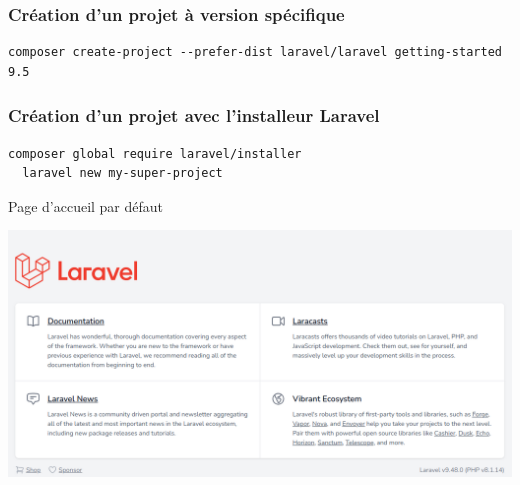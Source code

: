 \documentclass{beamer}
\begin{document}
\begin{frame}[fragile]
\frametitle{Création d'un projet à version spécifique}
\begin{center}
\begin{Verbatim}[fontsize=\scriptsize]
composer create-project --prefer-dist laravel/laravel getting-started 9.5
\end{Verbatim}
\end{center}
\end{frame}

\begin{frame}[fragile]
\frametitle{Création d'un projet avec l'installeur Laravel}
\begin{Verbatim}[fontsize=\small]
  composer global require laravel/installer
  laravel new my-super-project
\end{Verbatim}
\end{frame}

\begin{frame}{Page d'accueil par défaut}
\begin{center}
  \includegraphics[scale=0.25]{images/laravel-welcome-page.png}
\end{center}
\end{frame}
\end{document}
